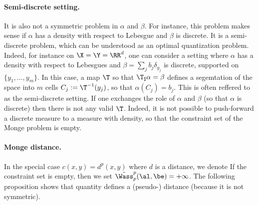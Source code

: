 \paragraph{Semi-discrete setting.}

It is also not a symmetric problem in $\alpha$ and $\beta$. For instance, this problem makes sense if $\alpha$ has a density with respect to Lebesgue and $\beta$ is discrete. It is a semi-discrete problem, which can be understood as an optimal quantization problem. 
%
Indeed, for instance on $\X=\Y=\RR^d$, one can consider a setting where $\alpha$ has a density with respect to Lebesgues and $\beta = \sum_j b_j \delta_{y_j}$ is discrete, supported on $\{y_1,\ldots,y_m\}$. In this case, a  map $\T$ so that $\T_\sharp \alpha=\beta$ defines a segemtation of the space into $m$ cells $C_j := \T^{-1}(y_j)$, so that $\alpha(C_j)=b_j$. This is often reffered to as the semi-discrete setting. 
%
If one exchanges the role of $\alpha$ and $\beta$ (so that $\alpha$ is discrete) then there is not any valid $\T$.  
Indeed, it is not possible to push-forward a discrete measure to a measure with density, so that the constraint set of the Monge problem is empty. 



\paragraph{Monge distance.}

In the special case $c(x,y)=d^p(x,y)$ where $d$ is a distance, we denote 
If the constraint set is empty, then we set $\tilde \Wass_p^p(\al,\be) = +\infty$.
%
The following proposition shows that quantity defines a (pseudo-) distance (because it is not symmetric).

